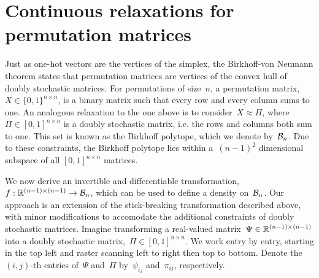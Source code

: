 \section{Continuous relaxations for permutation matrices}
Just as one-hot vectors are the vertices of the simplex, the Birkhoff-von Neumann
theorem states that permutation matrices are vertices of the convex
hull of doubly stochastic matrices.
For permutations of size~$n$, a permutation matrix,~$X \in \{0,1\}^{n \times n}$,
is a binary matrix such that every row and every column sums to one.
An analogous relaxation to the one above is to consider~$X \approx {\Pi}$,
where~${\Pi} \in [0,1]^{n \times n}$ is a doubly stochastic matrix,
i.e. the rows and columns both sum to one. This set is known as the Birkhoff
polytope, which we denote by~$\mathcal{B}_n$. Due to these constraints, the Birkhoff
polytope lies within a~$(n-1)^2$ dimensional subspace of all $[0,1]^{n \times n}$ matrices. 

We now derive an invertible and differentiable transformation,~$f: \mathbb{R}^{(n-1) \times (n-1)} \to \mathcal{B}_n$,
which can be used to define a density on~$\mathcal{B}_n$. Our approach is an
extension of the stick-breaking transformation described above, with minor
modifications to accomodate the additional constraints of doubly stochastic
matrices. Imagine transforming a real-valued matrix~$\Psi \in \mathbb{R}^{(n-1) \times (n-1)}$
into a doubly stochastic matrix,~${\Pi} \in [0,1]^{n \times n}$.
We work entry by entry, starting in the top left
and raster scanning left to right then top to bottom. Denote the~$(i,j)$-th entries
of~$\Psi$ and~${\Pi}$ by~$\psi_{ij}$ and~${\pi}_{ij}$, respectively.

